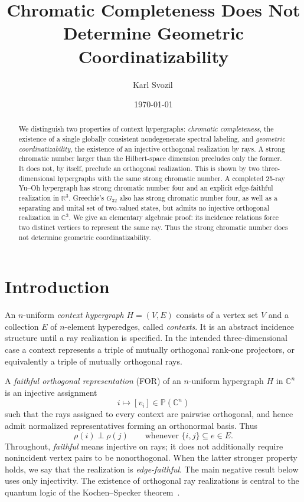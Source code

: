 \documentclass[aps,pra,twocolumn,superscriptaddress,10pt]{revtex4-2}
\newcommand{\C}{\mathbb{C}}
\newcommand{\R}{\mathbb{R}}
\newcommand{\PP}{\mathbb{P}}
\begin{document}
\title{Chromatic Completeness Does Not Determine Geometric Coordinatizability}

\author{Karl Svozil\,}

\date{\today}

\begin{abstract}
We distinguish two properties of context hypergraphs: \emph{chromatic
completeness}, the existence of a single globally consistent nondegenerate
spectral labeling, and \emph{geometric coordinatizability}, the existence of
an injective orthogonal realization by rays.  A strong chromatic number larger
than the Hilbert-space dimension precludes only the former.  It does not, by
itself, preclude an orthogonal realization.  This is shown by two
three-dimensional hypergraphs with the same strong chromatic number.  A
completed 25-ray Yu--Oh hypergraph has strong chromatic number four and an
explicit edge-faithful realization in $\R^3$.  Greechie's $G_{32}$ also has
strong chromatic number four, as well as a separating and unital set of
two-valued states, but admits no injective orthogonal realization in $\C^3$.
We give an elementary algebraic proof: its incidence relations force two
distinct vertices to represent the same ray.  Thus the strong chromatic number
does not determine geometric coordinatizability.
\end{abstract}

\maketitle

\section{Introduction}

An $n$-uniform \emph{context hypergraph} $H=(V,E)$ consists of a vertex set
$V$ and a collection $E$ of $n$-element hyperedges, called \emph{contexts}.
It is an abstract incidence structure until a ray realization is specified.
In the intended three-dimensional case a context represents a triple of
mutually orthogonal rank-one projectors, or equivalently a triple of mutually
orthogonal rays.

A \emph{faithful orthogonal representation} (FOR) of an $n$-uniform
hypergraph $H$ in $\C^n$ is an injective assignment
\[
    i\longmapsto [v_i]\in \PP(\C^n)
\]
such that the rays assigned to every context are pairwise orthogonal, and
hence admit normalized representatives forming an orthonormal basis.  Thus
\[
    \rho(i)\perp\rho(j)\qquad
    \text{whenever }\{i,j\}\subseteq e\in E.
\]
Throughout, \emph{faithful} means injective on rays; it does not additionally
require nonincident vertex pairs to be nonorthogonal.  When the latter
stronger property holds, we say that the realization is \emph{edge-faithful}.
The main negative result below uses only injectivity.  The existence of
orthogonal ray realizations is central to the quantum logic of the
Kochen--Specker theorem~\cite{kochen1}.
\end{document}
